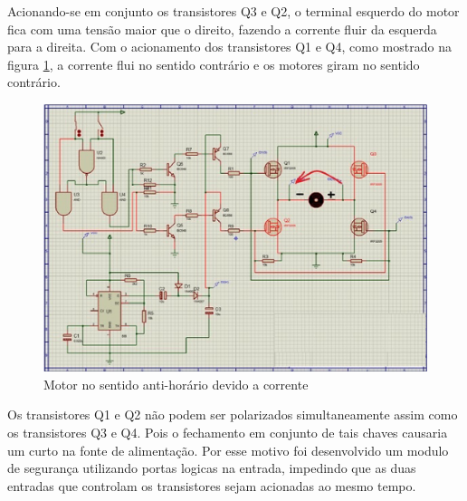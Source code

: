 Acionando-se em conjunto os transistores Q3 e Q2, o terminal esquerdo do motor fica com uma tensão maior que o direito, fazendo a corrente fluir da esquerda para a direita. Com o acionamento dos transistores Q1 e Q4, como mostrado na figura \ref{figx+3}, a corrente flui no sentido contrário e os motores giram no sentido contrário.

\begin{figure}[!htb]
	\centering
	\includegraphics[keepaspectratio=true,scale=1.2]{figuras/referencialteorico/figurax_3.eps}
	\caption{Motor no sentido anti-horário devido a corrente}
	\label{figx+3}
\end{figure}

Os transistores Q1 e Q2 não podem ser polarizados simultaneamente assim como os transistores Q3 e Q4. Pois o fechamento em conjunto de tais chaves causaria um curto na fonte de alimentação. Por esse motivo foi desenvolvido um modulo de segurança utilizando portas logicas na entrada, impedindo que as duas entradas que controlam os transistores sejam acionadas ao mesmo tempo.
